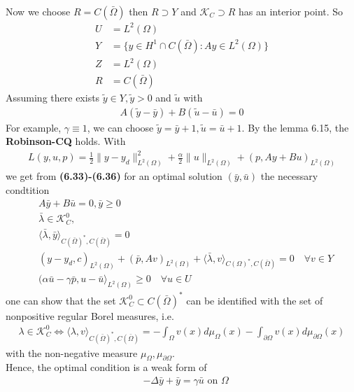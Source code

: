 \begin{example}
Now we choose $R = C(\bar{\Omega})$ then $R \supset Y$ and $\mathcal{K}_C \supset R$ has an interior point. So 
\begin{align*}
	U &= L^2(\Omega)\\
	Y &= \{y \in H^1 \cap C(\bar{\Omega}): Ay \in L^2(\Omega) \}\\
	Z &= L^2(\Omega)\\
	R &= C(\bar{\Omega}) 
\end{align*}
Assuming there exists $\tilde{y} \in Y, \tilde{y} > 0$ and $\tilde{u}$ with 
\begin{align*}
	A(\tilde{y} - \bar{y}) + B(\tilde{u} - \bar{u}) = 0
\end{align*}
For example, $\gamma \equiv 1$, we can choose $\tilde{y} = \bar{y} + 1, \tilde{u} = \bar{u} + 1$. By the lemma 6.15, the \textbf{Robinson-CQ} holds. With
\begin{align*}
	L(y, u, p) = \frac{1}{2}\| y - y_d\|^2_{L^2(\Omega)} + \frac{\alpha}{2}\|u\|_{L^2(\Omega)} + (p, Ay + Bu)_{L^2(\Omega)}
\end{align*}
we get from \textbf{(6.33)-(6.36)} for an optimal solution $(\bar{y}, \bar{u})$ the necessary condtition 
\begin{align*}
	&A \bar{y} + B\bar{u} = 0, \bar{y} \geq 0\\
	&\bar{\lambda} \in \mathcal{K}_C^0, \\
	&\langle \bar{\lambda}, \bar{y}\rangle_{C(\bar{\Omega})^*,C(\bar{\Omega})} = 0 \\
	&(y - y_d, c)_{L^2(\Omega)} + (\bar{p}, Av )_{L^2(\Omega)} + \langle \bar{\lambda}, v \rangle_{C(\Omega)^*, C(\bar{\Omega})} = 0 \quad \forall v \in Y\\
	&(\alpha \bar{u} - \gamma \bar{p}, u - \bar{u} \rangle_{L^2(\Omega)} \geq  0 \quad \forall u \in U
\end{align*}
one can show that the set $\mathcal{K}_C^0 \subset C(\bar{\Omega})^*$ can be identified with the set of nonpositive regular Borel measures, i.e. 
\begin{align*}
	\lambda \in \mathcal{K}^0_C \Leftrightarrow \langle \lambda , v \rangle_{C(\bar{\Omega})^*, C(\bar{\Omega})} = 
	- \int_\Omega v(x) d \mu_\Omega(x) - \int_{\partial \Omega} v(x) d\mu_{\partial \Omega}(x)
\end{align*}
with the non-negative measure $\mu_\Omega, \mu_{\partial\Omega}$. \\
Hence, the optimal condition is a weak form of
\begin{align*}
	&-\Delta \bar{y} + \bar{y} = \gamma \bar{u} \text{ on } \Omega\\

\end{align*}
\end{example}
